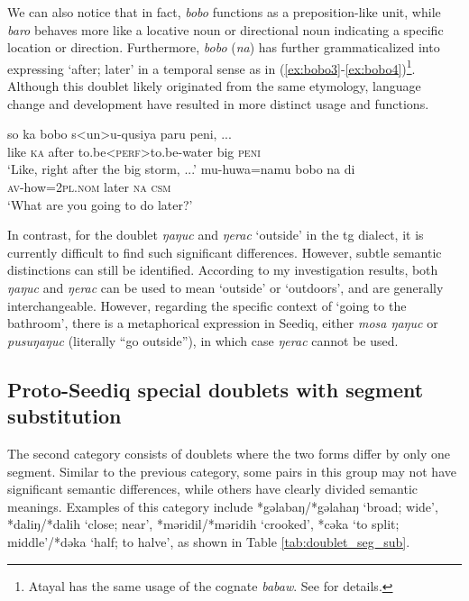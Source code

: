 We can also notice that in fact, \textit{bobo} functions as a preposition-like unit, while \textit{baro} behaves more like a locative noun or directional noun indicating a specific location or direction. Furthermore, \textit{bobo} (\textit{na}) has further grammaticalized into expressing `after; later' in a temporal sense as in (\ref{ex:bobo3}-\ref{ex:bobo4})\footnote{Atayal has the same usage of the cognate \textit{babaw}. See \textcite{weng2012babaw} for details.}. Although this doublet likely originated from the same etymology, language change and development have resulted in more distinct usage and functions.

\begin{exe}
    \ex 
    \begin{xlist}
        \ex \textcite{ILRDFEdict} \label{ex:bobo3}
        \gll so ka bobo s<un>u-qusiya paru peni, ... \\
        like \textsc{ka} after to.be<\textsc{\acs{perf}}>to.be-water big \textsc{peni}\\
        \glt `Like, right after the big storm, ...'
        \ex \textcite[132]{Sung2018Sedgrammar} \label{ex:bobo4}
        \gll mu-huwa=namu bobo na di \\
        \textsc{av}-how=2\textsc{pl.nom} later \textsc{na} \textsc{\acs{csm}} \\
        \glt `What are you going to do later?'
    \end{xlist}
\end{exe}

In contrast, for the doublet \textit{ŋaŋuc} and \textit{ŋerac} `outside' in the \acl{tg} dialect, it is currently difficult to find such significant differences. However, subtle semantic distinctions can still be identified. According to my investigation results, both \textit{ŋaŋuc} and \textit{ŋerac} can be used to mean `outside' or `outdoors', and are generally interchangeable. However, regarding the specific context of `going to the bathroom', there is a metaphorical expression in Seediq, either \textit{mosa ŋaŋuc} or \textit{pusuŋaŋuc} (literally ``go outside''), in which case \textit{ŋerac} cannot be used.

\subsection{Proto-Seediq special doublets with segment substitution}

The second category consists of doublets where the two forms differ by only one segment. Similar to the previous category, some pairs in this group may not have significant semantic differences, while others have clearly divided semantic meanings. Examples of this category include *gəlabaŋ/*gəlahaŋ `broad; wide', *daliŋ/*dalih `close; near', *məridil/*məridih `crooked', *cəka `to split; middle'/*dəka `half; to halve', as shown in Table \ref{tab:doublet_seg_sub}.

